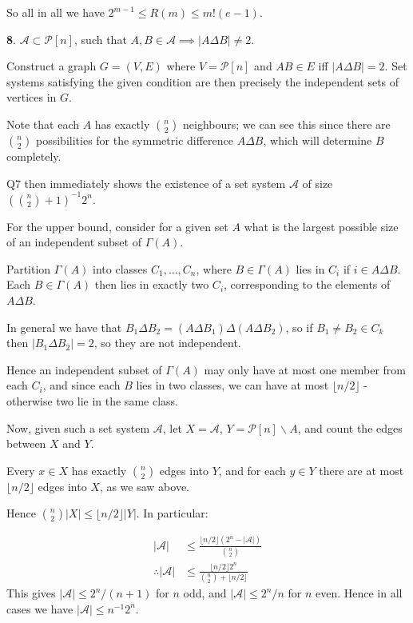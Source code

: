 \documentclass[]{article}
\theoremstyle{custhm}
\theoremstyle{cusdef}
\theoremstyle{custhm}
\theoremstyle{custhm}
\theoremstyle{custhm}
\theoremstyle{custhm}
\theoremstyle{cusdef}
\theoremstyle{remark}
\newcommand{\A}{\mathcal{A}}
\begin{document}
So all in all we have $2^{m-1}\le R(m) \le m!(e-1)$.

\clearpage

\textbf{8}. $\mathcal{A}\subset \mathcal{P}[n]$, such that $A,B\in \mathcal{A}\implies |A\Delta B| \ne 2$.

Construct a graph $G = (V,E)$ where $V = \mathcal{P}[n]$ and $AB\in E$ iff $|A\Delta B| = 2$. Set systems satisfying the given condition are then precisely the independent sets of vertices in $G$.

Note that each $A$ has exactly $\binom{n}{2}$ neighbours; we can see this since there are $\binom{n}{2}$ possibilities for the symmetric difference $A\Delta B$, which will determine $B$ completely.

Q7 then immediately shows the existence of a set system $\A$ of size $\left(\binom{n}{2}+1\right)^{-1}2^n$.

For the upper bound, consider for a given set $A$ what is the largest possible size of an independent subset of $\Gamma(A)$.

Partition $\Gamma(A)$ into classes $C_1,\dots,C_n$, where $B\in \Gamma(A)$ lies in $C_i$ if $i\in A\Delta B$. Each $B\in \Gamma(A)$ then lies in exactly two $C_i$, corresponding to the elements of $A\Delta B$.

In general we have that $B_1\Delta B_2 = (A\Delta B_1)\Delta (A\Delta B_2)$, so if $B_1\ne B_2 \in C_k$ then $|B_1\Delta B_2| = 2$, so they are not independent.

Hence an independent subset of $\Gamma(A)$ may only have at most one member from each $C_i$, and since each $B$ lies in two classes, we can have at most $\lfloor n/2 \rfloor$ - otherwise two lie in the same class.

Now, given such a set system $\A$, let $X = \A$, $Y = \mathcal{P}[n]\backslash A$, and count the edges between $X$ and $Y$.

Every $x\in X$ has exactly $\binom{n}{2}$ edges into $Y$, and for each $y\in Y$ there are at most $\lfloor n/2 \rfloor$ edges into $X$, as we saw above.

Hence $\binom{n}{2}|X| \le \lfloor n/2\rfloor |Y|$. In particular:

\begin{align*}
|\A| &\le \frac{\lfloor n/2 \rfloor (2^n - |\A|)}{\binom{n}{2}}\\
\therefore |\A|&\le \frac{\lfloor n/2 \rfloor 2^n}{\binom{n}{2}+\lfloor n/2 \rfloor} 
\end{align*}
This gives $|\A| \le 2^n/(n+1)$ for $n$ odd, and $|\A| \le 2^n/n$ for $n$ even. Hence in all cases we have $|\A| \le n^{-1}2^n$.
\end{document}
